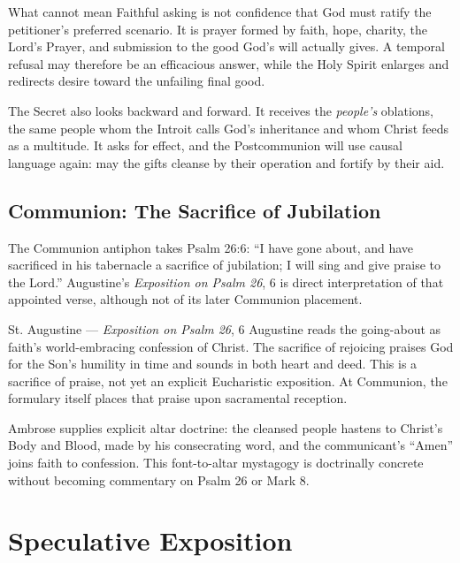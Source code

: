 \begin{deepstudy}
\begin{studybox}{What  cannot mean}
Faithful asking is not confidence that God must ratify the petitioner's preferred scenario. It is prayer formed by faith, hope, charity, the Lord's Prayer, and submission to the good God's will actually gives. A temporal refusal may therefore be an efficacious answer, while the Holy Spirit enlarges and redirects desire toward the unfailing final good.
\end{studybox}

The Secret also looks backward and forward. It receives the \emph{people's} oblations, the same people whom the Introit calls God's inheritance and whom Christ feeds as a multitude. It asks for effect, and the Postcommunion will use causal language again: may the gifts cleanse by their operation and fortify by their aid.

\sectionguard
\subsection*{Communion: The Sacrifice of Jubilation\enspace{}}

The Communion antiphon takes Psalm 26:6: ``I have gone about, and have sacrificed in his tabernacle a sacrifice of jubilation; I will sing and give praise to the Lord.'' Augustine's \emph{Exposition on Psalm 26}, 6 is direct interpretation of that appointed verse, although not of its later Communion placement.

\begin{sourcecard}{St. Augustine --- \emph{Exposition on Psalm 26}, 6}
Augustine reads the going-about as faith's world-embracing confession of Christ. The sacrifice of rejoicing praises God for the Son's humility in time and sounds in both heart and deed. This is a sacrifice of praise, not yet an explicit Eucharistic exposition. At Communion, the formulary itself places that praise upon sacramental reception.
\end{sourcecard}

Ambrose supplies explicit altar doctrine: the cleansed people hastens to Christ's Body and Blood, made by his consecrating word, and the communicant's ``Amen'' joins faith to confession. This font-to-altar mystagogy is doctrinally concrete without becoming commentary on Psalm 26 or Mark 8.

\newpage
\section*{Speculative Exposition}


\end{deepstudy}

